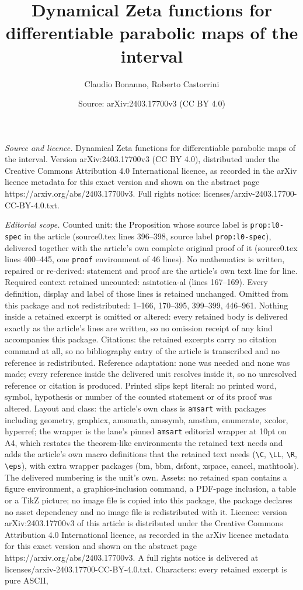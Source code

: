 \documentclass[10pt,a4paper]{amsart}
\title[Dynamical Zeta functions for differentiable parabolic maps o]{Dynamical Zeta functions for differentiable parabolic maps of the interval}
\author{Claudio Bonanno, Roberto Castorrini}
\date{Source: arXiv:2403.17700v3 (CC BY 4.0)}
\begin{document}
\maketitle

\noindent\emph{Source and licence.} Dynamical Zeta functions for differentiable parabolic maps of the interval. Version arXiv:2403.17700v3 (CC BY 4.0), distributed under the Creative Commons Attribution 4.0 International licence, as recorded in the arXiv licence metadata for this exact version and shown on the abstract page https://arxiv.org/abs/2403.17700v3. Full rights notice: licenses/arxiv-2403.17700-CC-BY-4.0.txt.\par\smallskip

\noindent\textit{Editorial scope.} Counted unit: the Proposition whose source label is \texttt{prop:l0-spec} in the article (source0.tex lines 396--398, source label \texttt{prop:l0-spec}), delivered together with the article's own complete original proof of it (source0.tex lines 400--445, one \texttt{proof} environment of 46 lines). No mathematics is written, repaired or re-derived: statement and proof are the article's own text line for line. Required context retained uncounted: asintotica-al (lines 167--169). Every definition, display and label of those lines is retained unchanged. Omitted from this package and not redistributed: 1--166, 170--395, 399--399, 446--961. Nothing inside a retained excerpt is omitted or altered: every retained body is delivered exactly as the article's lines are written, so no omission receipt of any kind accompanies this package. Citations: the retained excerpts carry no citation command at all, so no bibliography entry of the article is transcribed and no reference is redistributed. Reference adaptation: none was needed and none was made; every reference inside the delivered unit resolves inside it, so no unresolved reference or citation is produced. Printed slips kept literal: no printed word, symbol, hypothesis or number of the counted statement or of its proof was altered. Layout and class: the article's own class is \texttt{amsart} with packages including geometry, graphicx, amsmath, amssymb, amsthm, enumerate, xcolor, hyperref; the wrapper is the lane's pinned \texttt{amsart} editorial wrapper at 10pt on A4, which restates the theorem-like environments the retained text needs and adds the article's own macro definitions that the retained text needs (\texttt{\textbackslash C}, \texttt{\textbackslash LL}, \texttt{\textbackslash R}, \texttt{\textbackslash eps}), with extra wrapper packages (bm, bbm, dsfont, xspace, cancel, mathtools). The delivered numbering is the unit's own. Assets: no retained span contains a figure environment, a graphics-inclusion command, a PDF-page inclusion, a table or a TikZ picture; no image file is copied into this package, the package declares no asset dependency and no image file is redistributed with it. Licence: version arXiv:2403.17700v3 of this article is distributed under the Creative Commons Attribution 4.0 International licence, as recorded in the arXiv licence metadata for this exact version and shown on the abstract page https://arxiv.org/abs/2403.17700v3. A full rights notice is delivered at licenses/arxiv-2403.17700-CC-BY-4.0.txt. Characters: every retained excerpt is pure ASCII, 
\end{document}
